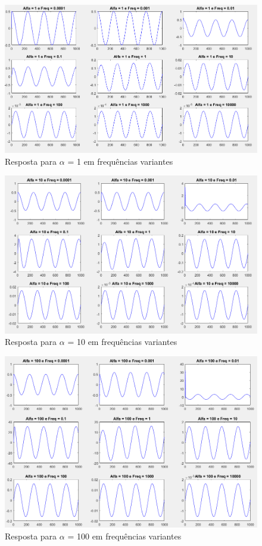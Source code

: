 \documentclass[a4paper, 12pt]{article}
\begin{document}
			\begin{figure}[!ht]
				\centering
				\includegraphics[scale=0.52]{img/3k_alfa4.png}
				\caption{Resposta para $\alpha$ = 1 em frequências variantes}
			\end{figure}
			\begin{figure}[!ht]
				\centering
				\includegraphics[scale=0.52]{img/3k_alfa5.png}
				\caption{Resposta para $\alpha$ = 10 em frequências variantes}
			\end{figure}
			\begin{figure}[!ht]
				\centering
				\includegraphics[scale=0.48]{img/3k_alfa6.png}
				\caption{Resposta para $\alpha$ = 100 em frequências variantes}
			\end{figure}
\end{document}
